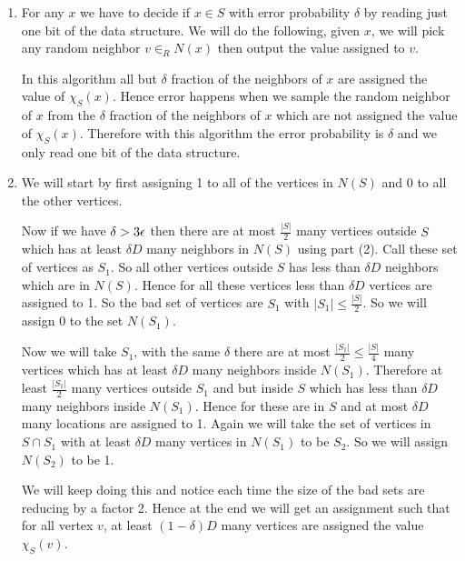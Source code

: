 \documentclass[a4paper, 11pt]{article}
\begin{document}
{\begin{enumerate}
	
	
	\item For any $x$ we have to decide if $x\in S$ with error probability $\delta$ by reading just one bit of the data structure. We will do the following, given $x$, we will pick any random neighbor $v\in_R N(x)$ then output the value assigned to $v$.
	
	In this algorithm all but $\delta$ fraction of the neighbors of $x$ are assigned the value of $\chi_S(x)$. Hence error happens when we sample the random neighbor of $x$ from the $\delta$ fraction of the neighbors of $x$ which are not assigned the value of $\chi_S(x)$. Therefore with this algorithm the error probability is $\delta $ and we only read one bit of the data structure.
	
	\item We will start by first assigning 1 to all of the vertices in $N(S)$ and 0 to all the other vertices.\parinn
	
	 Now if we have $\delta > 3\epsilon$ then there are at most $\frac{|S|}2$ many vertices outside $S$ which has at least $\delta D$ many neighbors in $N(S)$  using part (2). Call these set of vertices as $S_1$. So all other vertices outside $S$ has less than $\delta D$ neighbors which are in $N(S)$. Hence for all these vertices less than $\delta D$ vertices are assigned to 1. So the bad set of vertices are $S_1$ with $|S_1|\leq \frac{|S|}2$. So we will assign 0 to the set $N(S_1)$. 
	 
	 Now we will take $S_1$, with the same $\delta$ there are at most $\frac{|S_1|}2\leq \frac{|S|}{4}$ many vertices which has at least $\delta D$ many neighbors inside $N(S_1)$. Therefore at least $\frac{|S_1|}2$ many vertices outside $S_1$ and but inside $S$ which has less than $\delta D$ many neighbors inside $N(S_1)$. Hence for these are in $S$ and at most $\delta D$ many locations are assigned to 1. Again we will take the set of vertices in $S\cap S_1$ with at least $\delta D$ many vertices in $N(S_1)$ to be $S_2$. So we will assign $N(S_2)$ to be 1.
	 
	 We will keep doing this and notice each time the size of the bad sets are reducing by a factor 2. Hence at the end we will get an assignment such that for all vertex $v$, at least $(1-\delta)D$ many vertices are assigned the value $\chi_S(v)$. 
\end{enumerate}
}
\pagebreak

\end{document}
